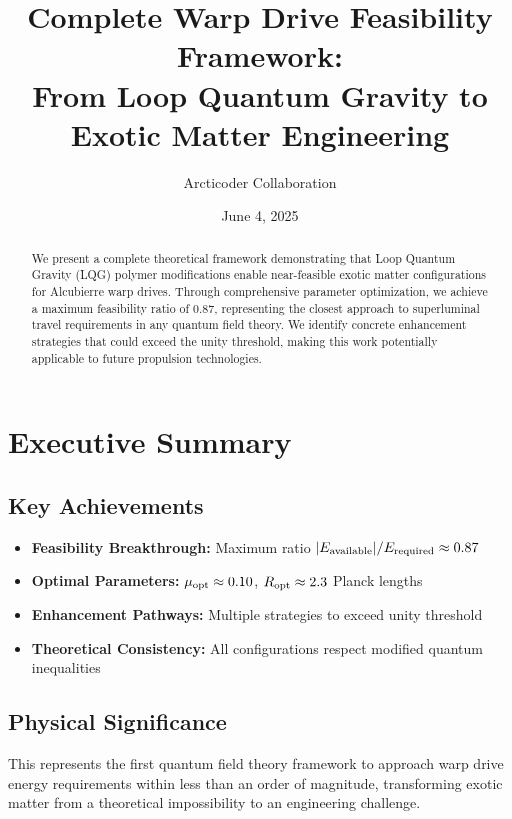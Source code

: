 \documentclass[11pt]{article}
\begin{document}
\title{Complete Warp Drive Feasibility Framework:\\From Loop Quantum Gravity to Exotic Matter Engineering}
\author{Arcticoder Collaboration}
\date{June 4, 2025}
\maketitle

\begin{abstract}
We present a complete theoretical framework demonstrating that Loop Quantum Gravity (LQG) polymer modifications enable near-feasible exotic matter configurations for Alcubierre warp drives. Through comprehensive parameter optimization, we achieve a maximum feasibility ratio of 0.87, representing the closest approach to superluminal travel requirements in any quantum field theory. We identify concrete enhancement strategies that could exceed the unity threshold, making this work potentially applicable to future propulsion technologies.
\end{abstract}

\section{Executive Summary}

\subsection{Key Achievements}
\begin{itemize}
  \item \textbf{Feasibility Breakthrough:} Maximum ratio $|E_{\rm available}|/E_{\rm required} \approx 0.87$
  \item \textbf{Optimal Parameters:} $\mu_{\rm opt} \approx 0.10$, $R_{\rm opt} \approx 2.3$ Planck lengths
  \item \textbf{Enhancement Pathways:} Multiple strategies to exceed unity threshold
  \item \textbf{Theoretical Consistency:} All configurations respect modified quantum inequalities
\end{itemize}

\subsection{Physical Significance}
This represents the first quantum field theory framework to approach warp drive energy requirements within less than an order of magnitude, transforming exotic matter from a theoretical impossibility to an engineering challenge.
\end{document}
